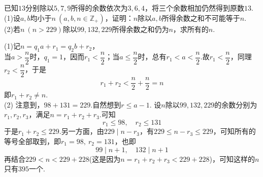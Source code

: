 \documentclass[cn,hazy,black,10pt,normal]{elegantnote}
\newenvironment{guess}{
  \color{guess}}{\newline \color{black}}
\begin{document}
\begin{cproblem} %
	已知$13$分别除以$5,7,9$所得的余数依次为$3,6,4$，将三个余数相加仍然得到原数$13$. \\
	(1)设$a,b$均小于$n~(a,b,n \in \mathbb{Z}_+)$，证明：$n$除以$a,b$所得余数之和不可能等于$n$. \\
	(2)若$n~(n>229)$除以$99,132,229$所得余数之和仍为$n$，求所有的$n$.
\end{cproblem}
\begin{solution}
	(1)记$n=q_1a+r_1=q_2b+r_2$， \\
	当$a>\dfrac{n}{2}$时，$q_1=1$，因而$r_1<\dfrac{n}{2}$；当$a \leq \dfrac{n}{2}$时，总有$r_1 < a <\dfrac{n}{2}$.故$r_1<\dfrac{n}{2}$，同理$r_2<\dfrac{n}{2}$，于是$$r_1+r_2 < \frac{n}{2} + \frac{n}{2} = n$$
	即$r_1+r_2 \neq n$. \\
	(2)\begin{guess}
		注意到，$98+131=229$.自然想到$r \leq a-1$.
	\end{guess}
	设$n$除以$99,132,229$的余数分别为$r_1,r_2,r_3$，满足$n=r_1+r_2+r_3$.可知$$r_1 \leq 98,\quad r_2 \leq 131$$
	于是$r_1+r_2 \leq 229$.另一方面，由$229\mid n-r_3$，有$229 \leq n-r_3 \leq 229$，可知所有的等号全部取到，即$r_1=98,~r_2=131$，也即$$99\mid n+1,\quad 132\mid n+1$$
	再结合$229<n<229+228$(这是因为$n=r_1+r_2+r_3<229+228$)，可知这样的$n$只有$395$一个.
\end{solution}
\end{document}
